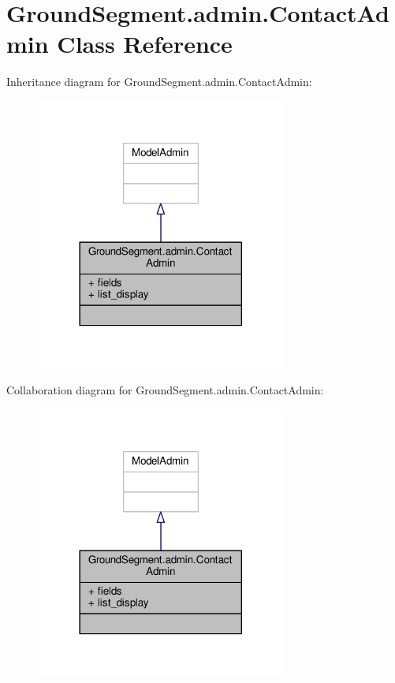 \hypertarget{class_ground_segment_1_1admin_1_1_contact_admin}{}\section{Ground\+Segment.\+admin.\+Contact\+Admin Class Reference}
\label{class_ground_segment_1_1admin_1_1_contact_admin}


Inheritance diagram for Ground\+Segment.\+admin.\+Contact\+Admin\+:\nopagebreak
\begin{figure}[H]
\begin{center}
\leavevmode
\includegraphics[width=234pt]{class_ground_segment_1_1admin_1_1_contact_admin__inherit__graph}
\end{center}
\end{figure}


Collaboration diagram for Ground\+Segment.\+admin.\+Contact\+Admin\+:\nopagebreak
\begin{figure}[H]
\begin{center}
\leavevmode
\includegraphics[width=234pt]{class_ground_segment_1_1admin_1_1_contact_admin__coll__graph}
\end{center}
\end{figure}

